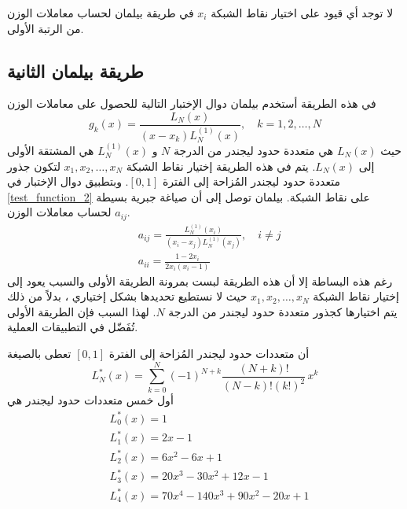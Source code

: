\begin{note}
	لا توجد أي قيود على اختيار نقاط الشبكة $x_i$ في طريقة بيلمان لحساب معاملات الوزن من الرتبة الأولى.
\end{note}

\subsection[طريقة بيلمان الثانية]{طريقة بيلمان الثانية \cite{Bellman} }

في هذه الطريقة أستخدم بيلمان دوال الإختبار التالية للحصول على معاملات الوزن
\begin{equation}
	\label{test_function_2}
	g_k(x)=\frac{L_N(x)}{(x-x_k)L_N^{(1)}(x)},\quad k=1,2,\dots,N
\end{equation}
حيث $L_N(x)$ هي متعددة حدود ليجندر من الدرجة $N$ و $L_N^{(1)}(x)$ هي المشتقة الأولى إلى $L_N(x)$. يتم في هذه الطريقة إختيار نقاط الشبكة $x_1,x_2,\dots,x_N$ لتكون جذور متعددة حدود ليجندر المُزاحة إلى الفترة $[0,1]$. وبتطبيق دوال الإختبار في \eqref{test_function_2} على نقاط الشبكة. بيلمان توصل إلى أن صياغة جبرية بسيطة لحساب معاملات الوزن $a_{ij}$.
\begin{equation}
	\label{bilman2_equations}
	\begin{aligned}
		&a_{ij}=\frac{L_N^{(1)}(x_i)}{(x_i-x_j)L_N^{(1)}(x_j)},\quad i\neq j\\[10pt]
		& a_{ii}=\frac{1-2x_i}{2x_i(x_i-1)}   
	\end{aligned}
\end{equation}
رغم هذه البساطة إلا أن هذه الطريقة لبست بمرونة الطريقة الأولى والسبب يعود إلى إختيار نقاط الشبكة $x_1,x_2,\dots,x_N$ حيث لا نستطيع تحديدها بشكل إختياري ، بدلاً من ذلك يتم اختيارها كجذور متعددة حدود ليجندر من الدرجة $N$. لهذا السبب فإن الطريقة الأولى تُفَضّل في التطبيقات العملية.

\begin{note}
	أن متعددات حدود ليجندر المُزاحة إلى الفترة $[0,1]$ تعطى بالصيغة 
	\begin{equation*}
		L_N^{*}(x)=\sum_{k=0}^{N}(-1)^{N+k}\frac{(N+k)!}{(N-k)!(k!)^2}\,x^k
	\end{equation*}
	أول خمس متعددات حدود ليجندر هي
	\begin{align*}
		&L_0^{*}(x)=1\\
		&L_1^{*}(x)=2x-1\\
		&L_2^{*}(x)=6x^2-6x+1\\
		&L_3^{*}(x)=20x^3-30x^2+12x-1\\
		&L_4^{*}(x)=70x^4-140x^3+90x^2-20x+1
	\end{align*}
\end{note}

